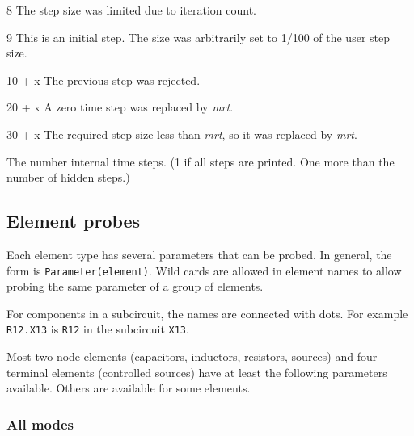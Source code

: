 \begin{description}
\begin{description}
\item{8} The step size was limited due to iteration count.

\item{9} This is an initial step.  The size was arbitrarily set to 1/100
of the user step size.

\item{10 + x} The previous step was rejected.

\item{20 + x} A zero time step was replaced by {\it mrt}.

\item{30 + x} The required step size less than {\it mrt}, so it was 
replaced by {\it mrt}.

\end{description}

\item[{\tt control(1)}] The number internal time steps.  (1 if all steps are
printed.  One more than the number of hidden steps.)

\end{description}
\subsection{Element probes}

Each element type has several parameters that can be probed.  In general,
the form is {\tt Parameter(element)}.  Wild cards are allowed in element
names to allow probing the same parameter of a group of elements.

For components in a subcircuit, the names are connected with dots.  For
example {\tt R12.X13} is {\tt R12} in the subcircuit {\tt X13}.

Most two node elements (capacitors, inductors, resistors, sources) and
four terminal elements (controlled sources) have at least the
following parameters available.  Others are available for some
elements.
\subsubsection{All modes}

